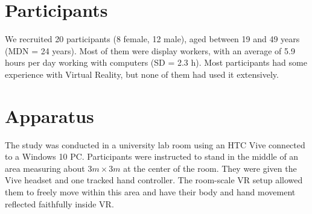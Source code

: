 \documentclass{tufte-book} %
\begin{document}
\section{Participants}
We recruited 20 participants (8 female, 12 male), aged between 19 and 49 years (MDN = 24 years). Most of them were display workers, with an average of 5.9 hours per day working with computers (SD = 2.3 h). Most participants had some experience with Virtual Reality, but none of them had used it extensively.

\section{Apparatus}
The study was conducted in a university lab room using an HTC Vive connected to a Windows 10 PC. Participants were instructed to stand in the middle of an area measuring about $3m \times 3m$ at the center of the room. They were given the Vive headset and one tracked hand controller. The room-scale VR setup allowed them to freely move within this area and have their body and hand movement reflected faithfully inside VR.
\end{document}
